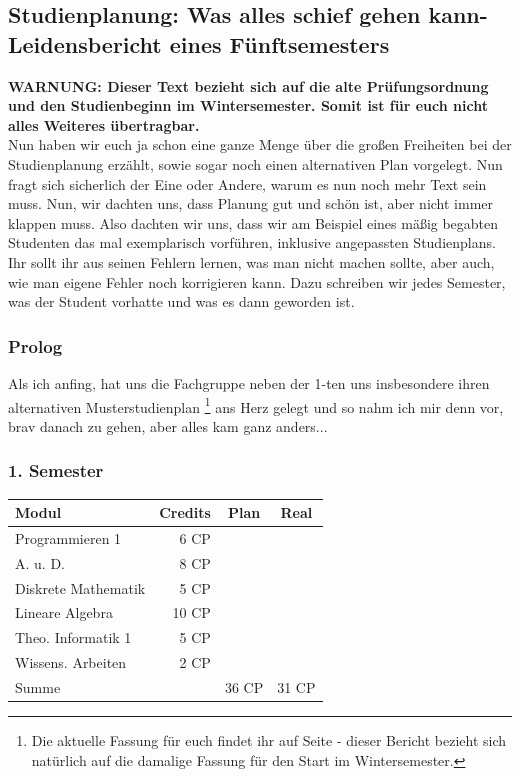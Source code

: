 \subsection{Studienplanung: Was alles schief gehen kann-
  Leidensbericht eines Fünftsemesters}
\label{studienplan_bericht}
  \textbf{WARNUNG: Dieser Text bezieht sich auf die alte
  Prüfungsordnung und den Studienbeginn im Wintersemester. Somit ist
  für euch nicht alles Weiteres übertragbar.}\\
Nun haben wir euch ja schon eine ganze Menge über die großen
Freiheiten bei der Studienplanung erzählt, sowie sogar noch einen
alternativen Plan vorgelegt. Nun fragt sich sicherlich der Eine oder
Andere, warum es nun noch mehr Text sein muss. Nun, wir dachten uns,
dass Planung gut und schön ist, aber nicht immer klappen muss. Also
dachten wir uns, dass wir am Beispiel eines mäßig begabten Studenten
das mal exemplarisch vorführen, inklusive angepassten
Studienplans. 
Ihr sollt ihr aus seinen Fehlern lernen, was man nicht machen sollte, aber
auch, wie man eigene Fehler noch korrigieren kann. Dazu schreiben wir
jedes Semester, was der Student vorhatte und was es dann geworden ist.
\subsubsection{Prolog}
Als ich anfing, hat uns die Fachgruppe neben der 1-ten uns
insbesondere ihren alternativen Musterstudienplan
\footnote{Die aktuelle Fassung für euch findet ihr auf Seite \pageref{studienplan_neu} - dieser Bericht bezieht sich natürlich 
auf die damalige Fassung für den Start im Wintersemester.}
ans Herz gelegt und
so nahm ich mir denn vor, brav danach zu gehen, aber alles kam ganz
anders...
\subsubsection*{1. Semester}

\newcommand{\nx}{\checkmark}

{
\footnotesize
\begin{tabular}{|l|r|c|c|}
\hline \textbf{Modul}		& \textbf{Credits} 	& \textbf{Plan} & \textbf{Real} \\ 
\hline
\hline Programmieren 1 		& 6 CP 				& \nx 			& \nx 	\\ 
\hline A. u. D.				& 8 CP 				& \nx 			& \nx 	\\ 
\hline Diskrete Mathematik 	& 5 CP 				& \nx 			& \nx 	\\ 
\hline Lineare Algebra 		& 10 CP 			& \nx 			& \nx 	\\ 
\hline Theo. Informatik 1	& 5 CP 				& \nx 			&  		\\ 
\hline Wissens. Arbeiten 	& 2 CP 				& \nx 			& \nx 	\\ 
\hline
\hline Summe 				&  					& 36 CP 		& 31 CP \\ 
\hline 
\end{tabular}
}

